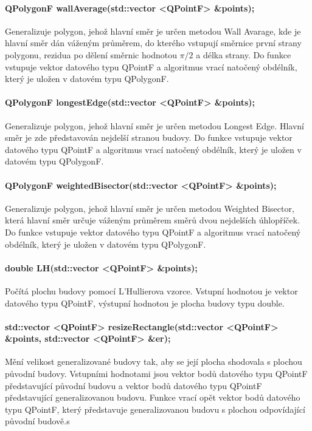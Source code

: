 \documentclass[11pt]{article}
\begin{document}
	 	\paragraph{QPolygonF wallAverage(std::vector <QPointF> \&points);}
	 	Generalizuje polygon, jehož hlavní směr je určen metodou Wall Avarage, kde je hlavní směr dán váženým průměrem, do kterého vstupují směrnice první strany polygonu, rezidua po dělení směrnic hodnotou $\pi/2$ a délka strany. Do funkce vstupuje vektor datového typu QPointF a algoritmus vrací natočený obdélník, který je uložen v datovém typu QPolygonF.
	 	
	 	\paragraph{QPolygonF longestEdge(std::vector <QPointF> \&points);}
	 	Generalizuje polygon, jehož hlavní směr je určen metodou Longest Edge. Hlavní směr je zde představován nejdelší stranou budovy. Do funkce vstupuje vektor datového typu QPointF a algoritmus vrací natočený obdélník, který je uložen v datovém typu QPolygonF.
	 	
	 	\paragraph{QPolygonF weightedBisector(std::vector <QPointF> \&points);}
	 	Generalizuje polygon, jehož hlavní směr je určen metodou Weighted Bisector, která hlavní směr určuje váženým průměrem směrů dvou nejdelších úhlopříček. Do funkce vstupuje vektor datového typu QPointF a algoritmus vrací natočený obdélník, který je uložen v datovém typu QPolygonF.
	 	
	 	\paragraph{double LH(std::vector <QPointF> \&points);}
	 	Počítá plochu budovy pomocí L'Hullierova vzorce. Vstupní hodnotou je vektor datového typu QPointF, výstupní hodnotou je plocha budovy typu double.
	 	
	 	\paragraph{std::vector <QPointF> resizeRectangle(std::vector <QPointF> \&points, std::vector <QPointF> \&er);}
	 	Mění velikost generalizované budovy tak, aby se její plocha shodovala s plochou původní budovy. Vstupními hodnotami jsou vektor bodů datového typu QPointF představující původní budovu a vektor bodů datového typu QPointF představující generalizovanou budovu. Funkce vrací opět vektor bodů datového typu QPointF, který představuje generalizovanou budovu s plochou odpovídající původní budově.s
	 	
\end{document}
